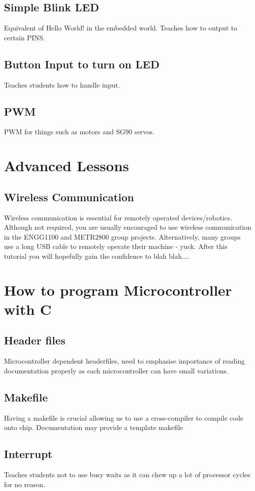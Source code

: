 \documentclass[11pt]{article}
\begin{document}
\subsection*{Simple Blink LED}
Equivalent of Hello World! in the embedded world. Teaches how to output to certain PINS.
\subsection*{Button Input to turn on LED}
Teaches students how to handle input.
\subsection*{PWM}
PWM for things such as motors and SG90 servos.

\section*{Advanced Lessons}
\subsection*{Wireless Communication}
Wireless communication is essential for remotely operated devices/robotics. 
Although not required, you are usually encouraged to use wireless 
communication in the ENGG1100 and METR2800 group projects.
Alternatively, many groups use a long USB cable to remotely operate their 
machine - yuck. After this tutorial you will hopefully gain the confidence to blah blah....

\section*{How to program Microcontroller with C}
\subsection*{Header files}
Microcontroller dependent headerfiles, need to emphasise importance of reading documentation properly
as each microcontroller can have small variations.
\subsection*{Makefile}
Having a makefile is crucial allowing us to use a cross-compiler to compile code onto chip.
Documentation may provide a template makefile

\subsection*{Interrupt}
Teaches students not to use busy waits as it can chew up a lot of processor cycles for no reason.
\end{document}
